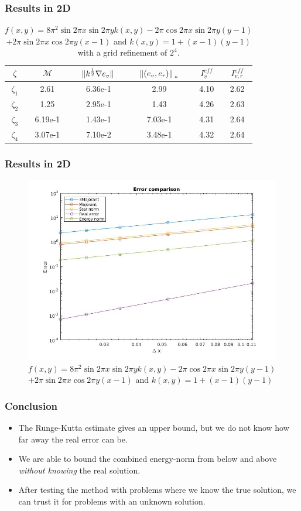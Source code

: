 \documentclass[t]{beamer}
\begin{document}
\begin{frame}[c]
    \frametitle{Results in 2D}
    \begin{table}[c]
		\begin{tabular}{c | c | c | c | c | c } 
            $\zeta$ & $\mathcal{M}$  & $\norm*{k^{\frac{1}{2}}\nabla e_v}$ & $\norm*{(e_v,e_r)}_{*}$ & $I_v^{eff}$ & $I_{v,r}^{eff}$ \\
            \hline \hline
            $\zeta_1$ & 2.61 & 6.36e-1 & 2.99 & 4.10 & 2.62 \\ 
            $\zeta_2$ & 1.25 & 2.95e-1 & 1.43 & 4.26 & 2.63 \\
            $\zeta_3$ & 6.19e-1 & 1.43e-1& 7.03e-1 & 4.31 & 2.64 \\
            $\zeta_4$ & 3.07e-1 & 7.10e-2 & 3.48e-1 & 4.32 & 2.64 \\
		\end{tabular}
		\caption{$f(x,y) = 8\pi^2\sin{2\pi x}\sin{2\pi y}k(x,y) - 2\pi\cos{2\pi x}\sin{2\pi y}(y-1)$ $+ 2\pi\sin{2\pi x}\cos{2\pi y}(x-1) $ and 
		$k(x,y) = 1 + (x-1)(y-1)$ with a grid refinement of $2^4$.}
	\end{table}
	
\end{frame}

\begin{frame}
	\frametitle{Results in 2D}
	\begin{figure}
		\centering
		\includegraphics[width = 0.7\linewidth]{../../Images/errorcomparison2d.jpg}
		\caption{$f(x,y) = 8\pi^2\sin{2\pi x}\sin{2\pi y}k(x,y) - 2\pi\cos{2\pi x}\sin{2\pi y}(y-1)$ $+ 2\pi\sin{2\pi x}\cos{2\pi y}(x-1) $ and 
		$k(x,y) = 1 + (x-1)(y-1)$}
	\end{figure}
\end{frame}

\begin{frame}
\frametitle{Conclusion}
\begin{itemize}
	\item The Runge-Kutta estimate gives an upper bound, but we do not know how far away the real error can be.
	\item We are able to bound the combined energy-norm from below and above \textit{without knowing} the real solution.
	\item After testing the method with problems where we know the true solution, we can trust it for problems with an unknown solution.
\end{itemize}
\end{frame}
\end{document}
